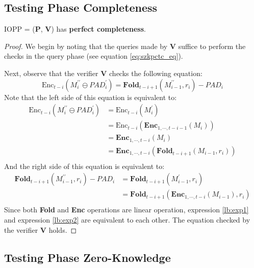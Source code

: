 \subsection{Testing Phase Completeness}

\begin{lemma}
\label{lemma:szkpctcc}

IOPP = ($\textbf{P}$, $\textbf{V}$) has \textbf{perfect completeness}.

\end{lemma}
\begin{proof}
We begin by noting that the queries made by $\textbf{V}$ suffice to perform the checks in the query phase (see equation \ref{eq:szkpctc_eq}).

Next, observe that the verifier $\textbf{V}$ checks the following equation:
$$
    \text{Enc}_{t-i}(M_i^{\prime\prime} \ominus PAD_{i}^\prime) = \textbf{Fold}_{t-i+1}(M_{i-1}^{\prime\prime}, r_i) - PAD_i 
$$
Note that the left side of this equation is equivalent to:
\begin{align}
\text{Enc}_{t-i}(M_i^{\prime\prime} \ominus PAD_{i}^\prime) &= \text{Enc}_{t-i}(M_i^\prime) \nonumber \\
&= \text{Enc}_{t-i}(\textbf{Enc}_{1, \cdots, t- i - 1}(M_i)) \nonumber \\
&= \textbf{Enc}_{1, \cdots, t-i}(M_i) \nonumber \\
&= \textbf{Enc}_{1, \cdots, t-i}(\textbf{Fold}_{t-i+1}(M_{i-1}, r_i)) \label{lb:exp1} \\
\end{align}
And the right side of this equation is equivalent to:
\begin{align}
\textbf{Fold}_{t-i+1}(M_{i-1}^{\prime\prime}, r_i) - PAD_i &= \textbf{Fold}_{t-i+1}(M_{i-1}^\prime, r_i) \nonumber \\
&= \textbf{Fold}_{t-i+1}(\textbf{Enc}_{1, \cdots, t- i}(M_{i-1}), r_i) \label{lb:exp2} \\
\end{align}
Since both \textbf{Fold} and \textbf{Enc} operations are linear operation, expression \ref{lb:exp1} and  expression \ref{lb:exp2} are equivalent to each other. The equation checked by the verifier $\textbf{V}$ holds.

\end{proof}

\subsection{Testing Phase Zero-Knowledge}


